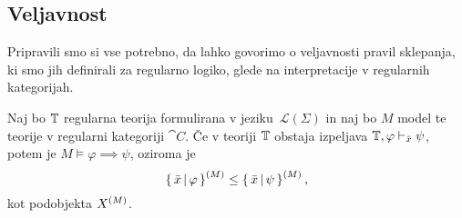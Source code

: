 \documentclass[../kategoricna_logika.tex]{subfiles}
\begin{document}
\subsection{Veljavnost}
Pripravili smo si vse potrebno, da lahko govorimo o veljavnosti pravil
sklepanja, ki smo jih definirali za regularno logiko, glede na
interpretacije v regularnih kategorijah.
\begin{izrek}[Veljavnost]
  Naj bo $\mathbb{T}$ regularna teorija formulirana v
  jeziku~$\mathcal{L}(\Sigma)$ in naj bo $M$ model te teorije v
  regularni kategoriji $\cat{C}$.  Če v teoriji $\mathbb{T}$ obstaja izpeljava
  $\mathbb{T}, \varphi \vdash_{\bar{x}} \psi$, potem je
  $M \models \varphi \implies \psi$, oziroma je
  \[\left\lbrace\,\bar{x} \,\middle|\, \varphi\,\right\rbrace^{(M)} \leq \left\lbrace\,\bar{x}
      \,\middle|\, \psi\,\right\rbrace^{(M)},\] kot podobjekta ${X}^{(M)}$.
\end{izrek}
\end{document}
